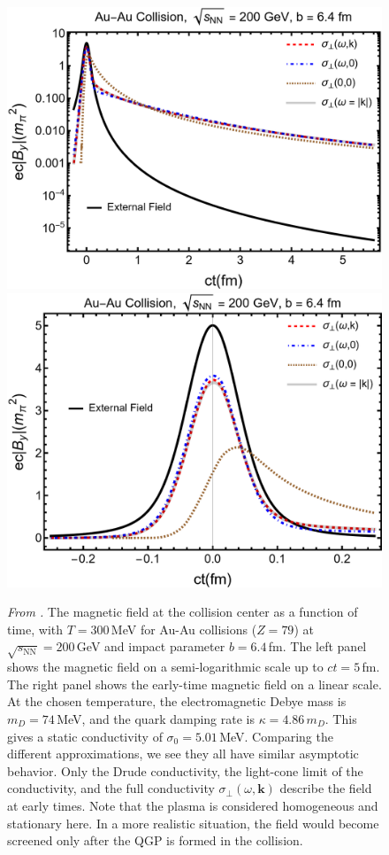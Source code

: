\phantom{Phantom text}
\begin{figure}[h]
\centering              
\includegraphics[width=0.46\linewidth]{plots/chap02QCD/bf100.png}
\hspace{0.05\linewidth}
\includegraphics[width=0.44\linewidth]{plots/chap02QCD/bf100lin.png}
\caption{\textit{From \cite{Grayson:2022asf}.} The magnetic field at the collision center as a function of time, with $T = 300$\,MeV for Au-Au collisions ($Z=79$) at $\sqrt{s_\text{NN}} = 200$\,GeV and impact parameter $b = 6.4\,$fm. The left panel shows the magnetic field on a semi-logarithmic scale up to $ct = 5$\,fm. The right panel shows the early-time magnetic field on a linear scale. At the chosen temperature, the electromagnetic Debye mass is $m_D = 74\,$MeV, and the quark damping rate is $\kappa = 4.86\,m_D$. This gives a static conductivity of $\sigma_0 = 5.01\,$MeV. Comparing the different approximations, we see they all have similar asymptotic behavior. Only the Drude conductivity, the light-cone limit of the conductivity, and the full conductivity $\sigma_\perp(\omega,\boldsymbol{k})$ describe the field at early times. Note that the plasma is considered homogeneous and stationary here. In a more realistic situation, the field would become screened only after the QGP is formed in the collision.\label{fig:bfcomp}}
\end{figure}


